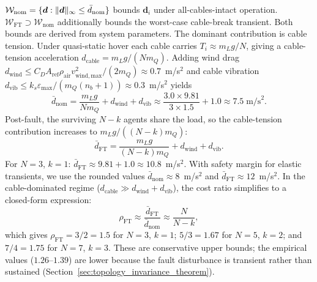 \begin{definition}\label{def:disturbance_sets_ps}
$\mathcal{W}_{\mathrm{nom}} = \{\bm{d} : \lVert \bm{d} \rVert_\infty \leq \bar{d}_{\mathrm{nom}}\}$ bounds $\bm{d}_i$ under all-cables-intact operation. $\mathcal{W}_{\mathrm{FT}} \supset \mathcal{W}_{\mathrm{nom}}$ additionally bounds the worst-case cable-break transient. Both bounds are derived from system parameters. The dominant contribution is cable tension. Under quasi-static hover each cable carries $T_i \approx m_L g / N$, giving a cable-tension acceleration $d_{\mathrm{cable}} = m_L g / (N m_Q)$. Adding wind drag $d_{\mathrm{wind}} \leq C_D A_{\mathrm{ref}} \rho_{\mathrm{air}} v_{\mathrm{wind,max}}^2 / (2 m_Q) \approx 0.7$~m/s$^2$ and cable vibration $d_{\mathrm{vib}} \leq k_s \varepsilon_{\max} / (m_Q (n_b+1)) \approx 0.3$~m/s$^2$ yields
\begin{equation}\label{eq:sigma_nom_derivation}
  \bar{d}_{\mathrm{nom}} = \frac{m_L g}{N m_Q} + d_{\mathrm{wind}} + d_{\mathrm{vib}} \approx \frac{3.0 \times 9.81}{3 \times 1.5} + 1.0 \approx 7.5 \;\text{m/s}^2.
\end{equation}
Post-fault, the surviving $N{-}k$ agents share the load, so the cable-tension contribution increases to $m_L g / ((N{-}k) m_Q)$:
\begin{equation}\label{eq:sigma_ft_derivation}
  \bar{d}_{\mathrm{FT}} = \frac{m_L g}{(N{-}k) m_Q} + d_{\mathrm{wind}} + d_{\mathrm{vib}}.
\end{equation}
For $N{=}3$, $k{=}1$: $\bar{d}_{\mathrm{FT}} \approx 9.81 + 1.0 \approx 10.8$~m/s$^2$. With safety margin for elastic transients, we use the rounded values $\bar{d}_{\mathrm{nom}} \approx 8$~m/s$^2$ and $\bar{d}_{\mathrm{FT}} \approx 12$~m/s$^2$. In the cable-dominated regime ($d_{\mathrm{cable}} \gg d_{\mathrm{wind}} + d_{\mathrm{vib}}$), the cost ratio simplifies to a closed-form expression:
\begin{equation}\label{eq:rho_closed_form}
  \rho_{\mathrm{FT}} \approx \frac{\bar{d}_{\mathrm{FT}}}{\bar{d}_{\mathrm{nom}}} \approx \frac{N}{N{-}k},
\end{equation}
which gives $\rho_{\mathrm{FT}} = 3/2 = 1.5$ for $N{=}3$, $k{=}1$; $5/3 = 1.67$ for $N{=}5$, $k{=}2$; and $7/4 = 1.75$ for $N{=}7$, $k{=}3$. These are conservative upper bounds; the empirical values ($1.26$--$1.39$) are lower because the fault disturbance is transient rather than sustained (Section~\ref{sec:topology_invariance_theorem}).
\end{definition}


